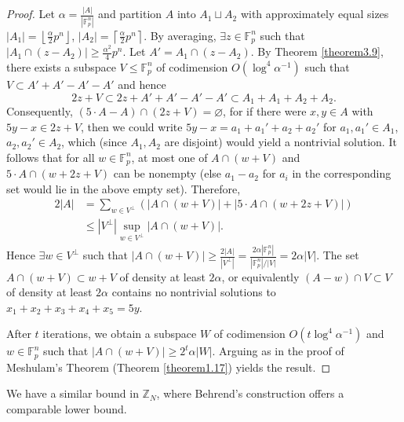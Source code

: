 \documentclass{article}
\theoremstyle{definition}
\begin{document}
\begin{proof}
    Let $\alpha = \frac{\left|A\right|}{\left|\mathbb{F}_p^n\right|}$ and partition $A$ into $A_1 \sqcup A_2$ with approximately equal sizes $\left|A_1\right| = \left\lfloor \frac{\alpha}{2} p^n \right\rfloor$, $\left|A_2\right| = \left\lceil \frac{\alpha}{2}p^n \right\rceil$. By averaging, $\exists z \in \mathbb{F}_p^n$ such that $\left|A_1 \cap (z-A_2)\right| \ge \frac{\alpha^2}{4}p^n$. Let $A' = A_1 \cap (z-A_2)$. By Theorem \ref{theorem3.9}, there exists a subspace $V\le \mathbb{F}_p^n$ of codimension $O(\log^4 \alpha^{-1})$ such that $V \subset A'+A'-A'-A'$ and hence $$2z + V \subset 2z + A' + A' - A' - A' \subset A_1 + A_1 + A_2 + A_2.$$ Consequently, $(5 \cdot A - A) \cap (2z + V) = \varnothing$, for if there were $x,y \in A$ with $5y-x \in 2z + V$, then we could write $5y - x = a_1 + a_1' + a_2 + a_2'$ for $a_1,a_1' \in A_1$, $a_2,a_2' \in A_2$, which (since $A_1, A_2$ are disjoint) would yield a nontrivial solution. It follows that for all $w \in \mathbb{F}_p^n$, at most one of $A \cap (w+V)$ and $5\cdot A \cap (w+2z+V)$ can be nonempty (else $a_1-a_2$ for $a_i$ in the corresponding set would lie in the above empty set). Therefore,
    \begin{align*}
        2\left|A\right| &= \sum_{w \in V^\perp}^{} \left(\left|A \cap (w + V)\right| + \left|5\cdot A \cap (w+2z + V)\right|\right) \\
        &\le \left|V^{\perp}\right| \sup_{w \in V^{\perp}} \left|A \cap (w +V)\right|.
    \end{align*} 
    Hence $\exists w \in V^\perp$ such that $\left|A \cap(w+V)\right| \ge \frac{2\left|A\right|}{\left|V^{\perp}\right|} = \frac{2\alpha \left|\mathbb{F}_p^n\right|}{\left|\mathbb{F}_p^n\right|/\left|V\right|} = 2\alpha\left|V\right|$. The set $A \cap (w +V) \subset w + V$ of density at least $2\alpha$, or equivalently $(A-w)\cap V \subset V$ of density at least $2\alpha$ contains no nontrivial solutions to $x_1+x_2+x_3+x_4+x_5=5y$. 
    
    \vspace{1mm}
     
    After $t$ iterations, we obtain a subspace $W$ of codimension $O(t \log^4 \alpha^{-1})$ and $w \in \mathbb{F}_p^n$ such that $\left|A \cap (w+V)\right| \ge 2^t \alpha \left|W\right|$. Arguing as in the proof of Meshulam's Theorem (Theorem \ref{theorem1.17}) yields the result.
\end{proof}
We have a similar bound in $\mathbb{Z}_N$, where Behrend's construction offers a comparable lower bound.
\end{document}

